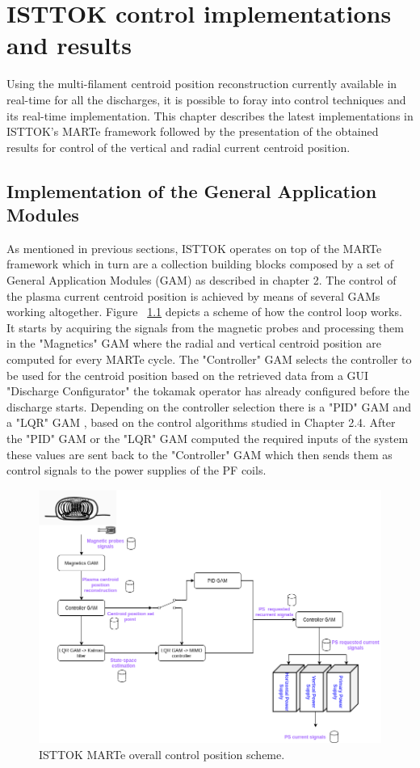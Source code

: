 \chapter{ISTTOK control implementations and results }

Using the multi-filament centroid position reconstruction currently available in real-time for all the discharges, it is possible to foray into control techniques and its real-time implementation. This chapter describes the latest implementations in ISTTOK's  MARTe framework followed by the presentation of the obtained results for control of the vertical and radial current centroid position.

\section{Implementation of the General Application Modules }

As mentioned in previous sections, ISTTOK operates on top of the MARTe framework which in turn are a collection building blocks composed by a set of General Application Modules (GAM) as described in chapter 2. The control of the plasma current centroid position is achieved by means of several GAMs working altogether.  Figure ~\ref{GAMsDiags} depicts a scheme of how the control loop works. It starts by acquiring  the signals from the magnetic probes and processing them in the "Magnetics" GAM where the radial and vertical centroid position are computed for every MARTe cycle. The "Controller" GAM selects the controller to be used for the centroid position based on the retrieved data from a GUI "Discharge Configurator" the tokamak operator has already configured before the discharge starts. Depending on the controller selection there is a "PID" GAM and a "LQR" GAM , based on the control algorithms studied in Chapter 2.4. After the "PID" GAM or the "LQR" GAM computed the required  inputs of the system these values are sent back to the "Controller" GAM which then sends them as control signals to the power supplies of the PF coils.\smallskip

\begin{figure}[h]
	\centering
	\includegraphics[width=1.0\textwidth]{Chp5/GAMsDiagram_1.png}	
	\caption{ISTTOK MARTe overall control position  scheme. \label{GAMsDiags}}
\end{figure}

